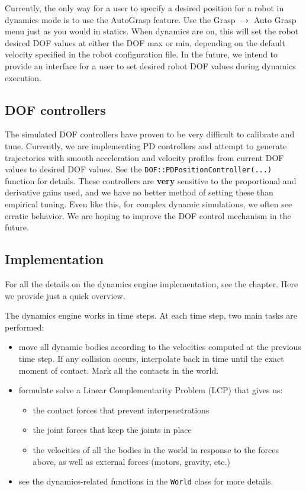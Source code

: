 Currently, the only way for a user to specify a desired position for a
robot in dynamics mode is to use the AutoGrasp feature. Use the Grasp
$\rightarrow$ Auto Grasp menu just as you would in statics. When dynamics are on,
this will set the robot desired DOF values at either the DOF max or
min, depending on the default velocity specified in the robot
configuration file. In the future, we intend to provide an interface
for a user to set desired robot DOF values during dynamics execution.

\subsection{DOF controllers}

The simulated DOF controllers have proven to be very difficult to
calibrate and tune. Currently, we are implementing PD controllers and
attempt to generate trajectories with smooth acceleration and velocity
profiles from current DOF values to desired DOF values. See the
\texttt{DOF::PDPositionController(...)} function for details. These
controllers are \textbf{very} sensitive to the proportional and
derivative gains used, and we have no better method of setting these
than empirical tuning. Even like this, for complex dynamic
simulations, we often see erratic behavior. We are hoping to improve
the DOF control mechanism in the future.

\subsection{Implementation}

For all the details on the dynamics engine implementation, see the
 chapter. Here we provide just a
quick overview.

The dynamics engine works in time steps. At each time step, two main
tasks are performed:
\begin{itemize}
\item move all dynamic bodies according to the velocities computed at
  the previous time step. If any collision occurs, interpolate back in
  time until the exact moment of contact. Mark all the contacts in the
  world.
\item formulate solve a Linear Complementarity Problem (LCP) that
  gives us:
\begin{itemize}
\item the contact forces that prevent interpenetrations
\item the joint forces that keep the joints in place
\item the velocities of all the bodies in the world in response to the
  forces above, as well as external forces (motors, gravity, etc.)
\end{itemize}
\item see the dynamics-related functions in the \texttt{World} class
  for more details.
\end{itemize}

